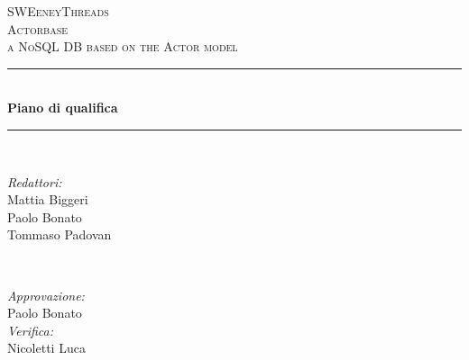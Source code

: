 \documentclass[a4paper]{article}
\begin{document}
	\begin{titlepage}
		\newcommand{\HRule}{\rule{\linewidth}{0.5mm}} 
		\center  
		
		\textsc{\LARGE SWEeneyThreads}\\[1.5cm] 
		\textsc{\Large Actorbase}\\[0.5cm] 
		\textsc{\large a NoSQL DB based on the Actor model}\\[0.5cm]
		
		
		\HRule \\[0.4cm]
		{ \huge \bfseries Piano di qualifica}\\[0.4cm] 
		\HRule \\[1.5cm]
		
		\begin{minipage}{0.4\textwidth}
			\begin{flushleft} \large
				\emph{Redattori:}\\
				Mattia Biggeri\\
				Paolo Bonato\\
				Tommaso Padovan\\
			\end{flushleft}
		\end{minipage}
		~
		\begin{minipage}{0.4\textwidth}
			\begin{flushright} \large
				\emph{Approvazione:} \\
                Paolo Bonato \\
				\emph{Verifica:} \\
                Nicoletti Luca \\
			\end{flushright}
		\end{minipage}
		

\end{titlepage}
\end{document}
